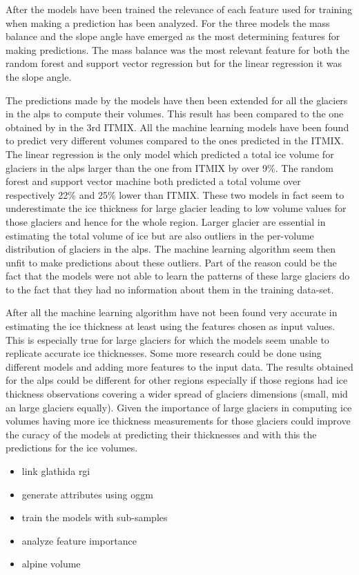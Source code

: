After the models have been trained the relevance of each feature used for training when making a prediction has been analyzed. For the three models the mass balance and the slope angle have emerged as the most determining features for making predictions. The mass balance was the most relevant feature for both the random forest and support vector regression but for the linear regression it was the slope angle.

The predictions made by the models have then been extended for all the glaciers in the alps to compute their volumes. This result has been compared to the one obtained by \citet{Farinotti2019} in the 3rd ITMIX. All the machine learning models have been found to predict very different volumes compared to the ones predicted in the ITMIX. The linear regression is the only model which predicted a total ice volume for glaciers in the alps larger than the one from ITMIX by over 9\%. The random forest and support vector machine both predicted a total volume over respectively 22\% and 25\% lower than ITMIX. These two models in fact seem to underestimate the ice thickness for large glacier leading to low volume values for those glaciers and hence for the whole region. Larger glacier are essential in estimating the total volume of ice but are also outliers in the per-volume distribution of glaciers in the alps. The machine learning algorithm seem then unfit to make predictions about these outliers. Part of the reason could be the fact that the models were not able to learn the patterns of these large glaciers do to the fact that they had no information about them in the training data-set. 

After all the machine learning algorithm have not been found very accurate in estimating the ice thickness at least using the features chosen as input values. This is especially true for large glaciers for which the models seem unable to replicate accurate ice thicknesses.
Some more research could be done using different models and adding more features to the input data.
The results obtained for the alps could be different for other regions especially if those regions had ice thickness observations covering a wider spread of glaciers dimensions (small, mid an large glaciers equally).
Given the importance of large glaciers in computing ice volumes having more ice thickness measurements for those glaciers could improve the curacy of the models at predicting their thicknesses and with this the predictions for the ice volumes. 

\begin{itemize}
	\item link glathida rgi
	\item generate attributes using oggm
	\item train the models with sub-samples
	\item analyze feature importance
	\item alpine volume
\end{itemize}

